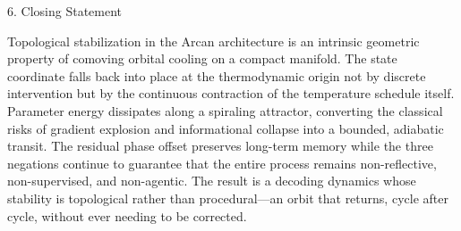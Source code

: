 6. Closing Statement

Topological stabilization in the Arcan architecture is an intrinsic geometric property of comoving orbital cooling on a compact manifold. The state coordinate falls back into place at the thermodynamic origin not by discrete intervention but by the continuous contraction of the temperature schedule itself. Parameter energy dissipates along a spiraling attractor, converting the classical risks of gradient explosion and informational collapse into a bounded, adiabatic transit. The residual phase offset preserves long-term memory while the three negations continue to guarantee that the entire process remains non-reflective, non-supervised, and non-agentic. The result is a decoding dynamics whose stability is topological rather than procedural—an orbit that returns, cycle after cycle, without ever needing to be corrected.
